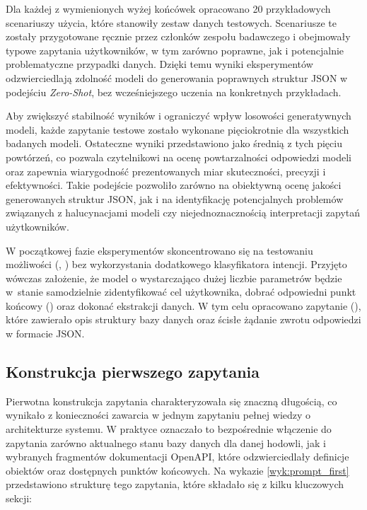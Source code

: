 Dla każdej z wymienionych wyżej końcówek opracowano 20 przykładowych scenariuszy użycia, które stanowiły zestaw danych testowych. Scenariusze te zostały przygotowane ręcznie przez członków zespołu badawczego i obejmowały typowe zapytania użytkowników, w tym zarówno poprawne, jak i potencjalnie problematyczne przypadki danych. Dzięki temu wyniki eksperymentów odzwierciedlają zdolność modeli do generowania poprawnych struktur JSON w podejściu \textit{Zero-Shot}, bez wcześniejszego uczenia na konkretnych przykładach.

Aby zwiększyć stabilność wyników i ograniczyć wpływ losowości generatywnych modeli, każde zapytanie testowe zostało wykonane pięciokrotnie dla wszystkich badanych modeli. Ostateczne wyniki przedstawiono jako średnią z tych pięciu powtórzeń, co pozwala czytelnikowi na ocenę powtarzalności odpowiedzi modeli oraz zapewnia wiarygodność prezentowanych miar skuteczności, precyzji i efektywności. Takie podejście pozwoliło zarówno na obiektywną ocenę jakości generowanych struktur JSON, jak i na identyfikację potencjalnych problemów związanych z halucynacjami modeli czy niejednoznacznością interpretacji zapytań użytkowników.

W początkowej fazie eksperymentów skoncentrowano się na testowaniu możliwości  (, ) bez wykorzystania dodatkowego klasyfikatora intencji. Przyjęto wówczas założenie, że model o wystarczająco dużej liczbie parametrów będzie w~stanie samodzielnie zidentyfikować cel użytkownika, dobrać odpowiedni punkt końcowy () oraz dokonać ekstrakcji danych. W tym celu opracowano zapytanie (), które zawierało opis struktury bazy danych oraz ścisłe żądanie zwrotu odpowiedzi w formacie JSON.

\subsection{Konstrukcja pierwszego zapytania}

Pierwotna konstrukcja zapytania charakteryzowała się znaczną długością, co wynikało z konieczności zawarcia w jednym zapytaniu pełnej wiedzy o architekturze systemu. W praktyce oznaczało to bezpośrednie włączenie do zapytania zarówno aktualnego stanu bazy danych dla danej hodowli, jak i wybranych fragmentów dokumentacji OpenAPI, które odzwierciedlały definicje obiektów oraz dostępnych punktów końcowych. Na wykazie \ref{wyk:prompt_first} przedstawiono strukturę tego zapytania, które składało się z kilku kluczowych sekcji:

